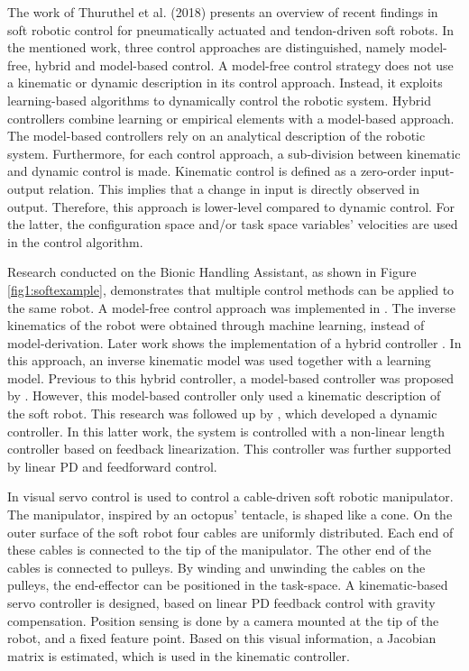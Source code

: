 The work of Thuruthel et al. (2018) \cite{george2018control} presents an overview of recent findings in soft robotic control for pneumatically actuated and tendon-driven soft robots. In the mentioned work, three control approaches are distinguished, namely model-free, hybrid and model-based control. A model-free control strategy does not use a kinematic or dynamic description in its control approach. Instead, it exploits learning-based algorithms to dynamically control the robotic system. Hybrid controllers combine learning or empirical elements with a model-based approach. The model-based controllers rely on an analytical description of the robotic system. Furthermore, for each control approach, a sub-division between kinematic and dynamic control is made. Kinematic control is defined as a zero-order input-output relation. This implies that a change in input is directly observed in output. Therefore, this approach is lower-level compared to dynamic control. For the latter, the configuration space and/or task space variables' velocities are used in the control algorithm. 


Research conducted on the Bionic Handling Assistant, as shown in Figure \ref{fig1:softexample}, demonstrates that multiple control methods can be applied to the same robot. A model-free control approach was implemented in \cite{rolf2013efficient}. The inverse kinematics of the robot were obtained through machine learning, instead of model-derivation. Later work shows the implementation of a hybrid controller \cite{reinhart2017hybrid}. In this approach, an inverse kinematic model was used together with a learning model. Previous to this hybrid controller, a model-based controller was proposed by \cite{mahl2014bhakin}. However, this model-based controller only used a kinematic description of the soft robot. This research was followed up by \cite{falkenhahn2016dynamic}, which developed a dynamic controller. In this latter work, the system is controlled with a non-linear length controller based on feedback linearization. This controller was further supported by linear PD and feedforward control. 

In \cite{wang2013visual} visual servo control is used to control a cable-driven soft robotic manipulator. The manipulator, inspired by an octopus' tentacle, is shaped like a cone. On the outer surface of the soft robot four cables are uniformly distributed. Each end of these cables is connected to the tip of the manipulator. The other end of the cables is connected to pulleys. By winding and unwinding the cables on the pulleys, the end-effector can be positioned in the task-space. A kinematic-based servo controller is designed, based on linear PD feedback control with gravity compensation. Position sensing is done by a camera mounted at the tip of the robot, and a fixed feature point. Based on this visual information, a Jacobian matrix is estimated, which is used in the kinematic controller.

